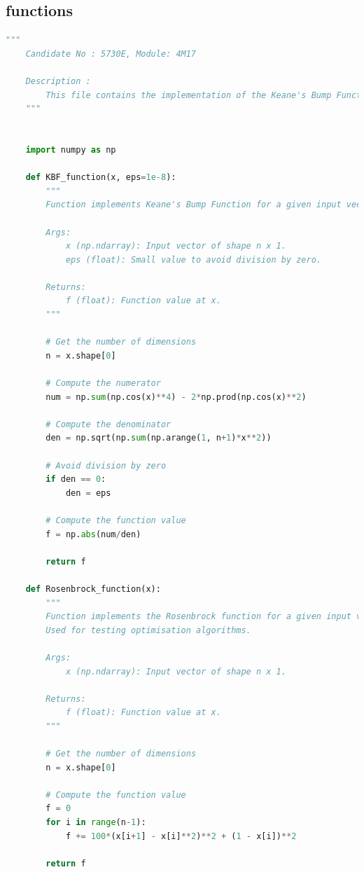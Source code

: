 \documentclass[10pt]{article}
\begin{document}
\subsection{functions}
\label{sec:functions}
\begin{lstlisting}[language=Python, caption=functions.py, label=functionspy]
    """
    Candidate No : 5730E, Module: 4M17 
    
    Description :
        This file contains the implementation of the Keane's Bump Function and the Rosenbrock function.
    """
    
    
    import numpy as np
    
    def KBF_function(x, eps=1e-8):
        """
        Function implements Keane's Bump Function for a given input vector x of shape n x 1.
    
        Args:
            x (np.ndarray): Input vector of shape n x 1.
            eps (float): Small value to avoid division by zero.
    
        Returns:
            f (float): Function value at x.
        """
    
        # Get the number of dimensions
        n = x.shape[0]
    
        # Compute the numerator
        num = np.sum(np.cos(x)**4) - 2*np.prod(np.cos(x)**2)
    
        # Compute the denominator
        den = np.sqrt(np.sum(np.arange(1, n+1)*x**2))
    
        # Avoid division by zero
        if den == 0:
            den = eps
    
        # Compute the function value
        f = np.abs(num/den)
    
        return f
    
    def Rosenbrock_function(x):
        """
        Function implements the Rosenbrock function for a given input vector x of shape n x 1.
        Used for testing optimisation algorithms.
    
        Args:
            x (np.ndarray): Input vector of shape n x 1.
    
        Returns:
            f (float): Function value at x.
        """
    
        # Get the number of dimensions
        n = x.shape[0]
    
        # Compute the function value
        f = 0
        for i in range(n-1):
            f += 100*(x[i+1] - x[i]**2)**2 + (1 - x[i])**2
    
        return f        
\end{lstlisting}
\end{document}
